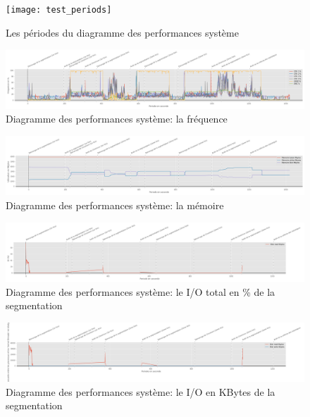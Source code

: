 \begin{figure}[H]
   \centering
   \texttt{[image: test\_periods]}
   \caption{Les périodes du diagramme des performances système}
   \label{fig:test_periods}
\end{figure}
{
   \clearpage 
   \newpage
   \begin{landscape}
   \begin{figure}[H]
      \centering
      \includegraphics[width=1.5\textwidth]{frequency_usage}
      \caption{Diagramme des performances système: la fréquence}
      \label{fig:frequency_usage}
   \end{figure}
   \begin{figure}[H]
      \centering
      \includegraphics[width=1.5\textwidth]{memory_usage}
      \caption{Diagramme des performances système: la mémoire}
      \label{fig:memory_usage}
   \end{figure} 
   \begin{figure}[H]
      \centering
      \includegraphics[width=1.5\textwidth]{io}
      \caption{Diagramme des performances système: le I/O total en \% de la segmentation}
      \label{fig:io}
   \end{figure}
   \begin{figure}[H]
      \centering
      \includegraphics[width=1.5\textwidth]{io_segnetcamera}
      \caption{Diagramme des performances système: le I/O en KBytes de la segmentation}

\end{figure}
\end{landscape}}
